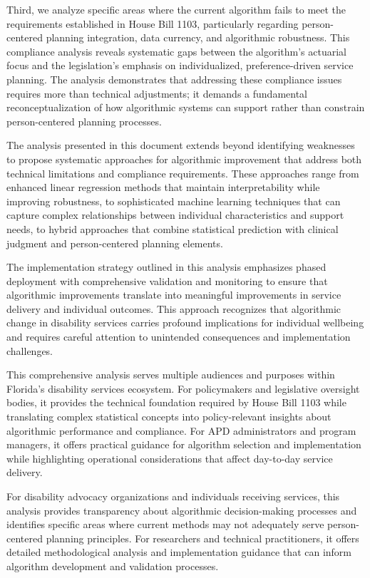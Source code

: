 Third, we analyze specific areas where the current algorithm fails to meet the requirements established in House Bill 1103, particularly regarding person-centered planning integration, data currency, and algorithmic robustness. This compliance analysis reveals systematic gaps between the algorithm's actuarial focus and the legislation's emphasis on individualized, preference-driven service planning. The analysis demonstrates that addressing these compliance issues requires more than technical adjustments; it demands a fundamental reconceptualization of how algorithmic systems can support rather than constrain person-centered planning processes.

The analysis presented in this document extends beyond identifying weaknesses to propose systematic approaches for algorithmic improvement that address both technical limitations and compliance requirements. These approaches range from enhanced linear regression methods that maintain interpretability while improving robustness, to sophisticated machine learning techniques that can capture complex relationships between individual characteristics and support needs, to hybrid approaches that combine statistical prediction with clinical judgment and person-centered planning elements.

The implementation strategy outlined in this analysis emphasizes phased deployment with comprehensive validation and monitoring to ensure that algorithmic improvements translate into meaningful improvements in service delivery and individual outcomes. This approach recognizes that algorithmic change in disability services carries profound implications for individual wellbeing and requires careful attention to unintended consequences and implementation challenges.

This comprehensive analysis serves multiple audiences and purposes within Florida's disability services ecosystem. For policymakers and legislative oversight bodies, it provides the technical foundation required by House Bill 1103 while translating complex statistical concepts into policy-relevant insights about algorithmic performance and compliance. For APD administrators and program managers, it offers practical guidance for algorithm selection and implementation while highlighting operational considerations that affect day-to-day service delivery.

For disability advocacy organizations and individuals receiving services, this analysis provides transparency about algorithmic decision-making processes and identifies specific areas where current methods may not adequately serve person-centered planning principles. For researchers and technical practitioners, it offers detailed methodological analysis and implementation guidance that can inform algorithm development and validation processes.

